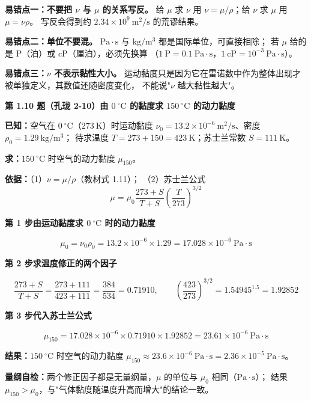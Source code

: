 \begin{yicuo}
\textbf{易错点一：不要把 $\nu$ 与 $\mu$ 的关系写反。}
给 $\mu$ 求 $\nu$ 用 $\nu=\mu/\rho$；给 $\nu$ 求 $\mu$ 用 $\mu=\nu\rho$。
写反会得到约 $2.34\times10^{9}\ \mathrm{m^2/s}$ 的荒谬结果。

\textbf{易错点二：单位不要混。}
$\mathrm{Pa\cdot s}$ 与 $\mathrm{kg/m^3}$ 都是国际单位，可直接相除；
若 $\mu$ 给的是 $\mathrm{P}$（泊）或 $\mathrm{cP}$（厘泊），必须先换算
（$1\ \mathrm{P}=0.1\ \mathrm{Pa\cdot s}$，$1\ \mathrm{cP}=10^{-3}\ \mathrm{Pa\cdot s}$）。

\textbf{易错点三：$\nu$ 不表示黏性大小。}
运动黏度只是因为它在雷诺数中作为整体出现才被单独定义，其数值还随密度变化，
不能说"$\nu$ 越大黏性越大"。
\end{yicuo}

\noindent\textbf{第 1.10 题（孔珑 2-10）\quad 由 $0\ ^{\circ}\mathrm{C}$ 的黏度求 $150\ ^{\circ}\mathrm{C}$ 的动力黏度}

\begin{jie}
\textbf{已知：}空气在 $0\ ^{\circ}\mathrm{C}$（$273\ \mathrm{K}$）时运动黏度
$\nu_0=13.2\times10^{-6}\ \mathrm{m^2/s}$、密度 $\rho_0=1.29\ \mathrm{kg/m^3}$；
待求温度 $T=273+150=423\ \mathrm{K}$；苏士兰常数 $S=111\ \mathrm{K}$。

\textbf{求：}$150\ ^{\circ}\mathrm{C}$ 时空气的动力黏度 $\mu_{150}$。

\textbf{依据：}（1）$\nu=\mu/\rho$（教材式 1.11）；
（2）苏士兰公式
\[ \mu=\mu_0\frac{273+S}{T+S}\left(\frac{T}{273}\right)^{3/2} \]

\textbf{第 1 步\quad 由运动黏度求 $0\ ^{\circ}\mathrm{C}$ 时的动力黏度}

\[ \mu_0=\nu_0\rho_0=13.2\times10^{-6}\times1.29=17.028\times10^{-6}\ \mathrm{Pa\cdot s} \]

\textbf{第 2 步\quad 求温度修正的两个因子}

\[ \frac{273+S}{T+S}=\frac{273+111}{423+111}=\frac{384}{534}=0.71910,\qquad
   \left(\frac{423}{273}\right)^{3/2}=1.54945^{1.5}=1.92852 \]

\textbf{第 3 步\quad 代入苏士兰公式}

\[ \mu_{150}=17.028\times10^{-6}\times0.71910\times1.92852
        =23.61\times10^{-6}\ \mathrm{Pa\cdot s} \]

\textbf{结果：}$150\ ^{\circ}\mathrm{C}$ 时空气的动力黏度
$\mu_{150}\approx23.6\times10^{-6}\ \mathrm{Pa\cdot s}=2.36\times10^{-5}\ \mathrm{Pa\cdot s}$。

\textbf{量纲自检：}两个修正因子都是无量纲量，$\mu$ 的单位与 $\mu_0$ 相同（$\mathrm{Pa\cdot s}$）；
结果 $\mu_{150}>\mu_0$，与"气体黏度随温度升高而增大"的结论一致。
\end{jie}

